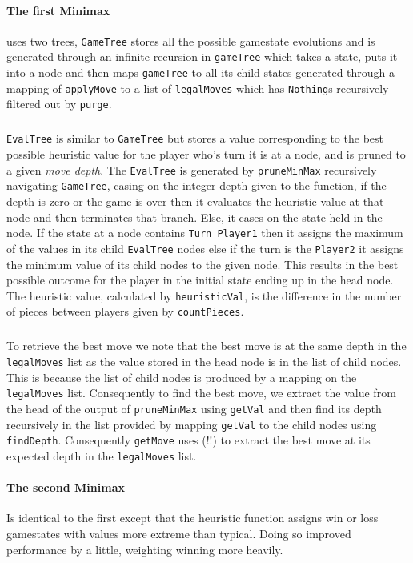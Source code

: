 \documentclass[11pt]{article}
\begin{document}
\paragraph{The first Minimax} uses two trees, \verb|GameTree| stores all the possible gamestate evolutions and is generated through an infinite recursion in \verb|gameTree| which takes a state, puts it into a node and then maps \verb|gameTree| to all its child states generated through a mapping of \verb|applyMove| to a list of \verb|legalMoves| which has \verb|Nothing|s recursively filtered out by \verb|purge|.

\subparagraph*{}\verb|EvalTree| is similar to \verb|GameTree| but stores a value corresponding to the best possible heuristic value for the player who's turn it is at a node, and is pruned to a given \textit{move depth}. The \verb|EvalTree| is generated by \verb|pruneMinMax| recursively navigating \verb|GameTree|, casing on the integer depth given to the function, if the depth is zero or the game is over then it evaluates the heuristic value at that node and then terminates that branch. Else, it cases on the state held in the node. If the state at a node contains \verb|Turn Player1| then it assigns the maximum of the values in its child \verb|EvalTree| nodes else if the turn is the \verb|Player2| it assigns the minimum value of its child nodes to the given node. This results in the best possible outcome for the player in the initial state ending up in the head node. The heuristic value, calculated by \verb|heuristicVal|, is the difference in the number of pieces between players given by \verb|countPieces|.

\subparagraph*{}To retrieve the best move we note that the best move is at the same depth in the \verb|legalMoves| list as the value stored in the head node is in the list of child nodes. This is because the list of child nodes is produced by a mapping on the \verb|legalMoves| list. Consequently to find the best move, we extract the value from the head of the output of \verb|pruneMinMax| using \verb|getVal| and then find its depth recursively in the list provided by mapping \verb|getVal| to the child nodes using \verb|findDepth|. Consequently \verb|getMove| uses (!!) to extract the best move at its expected depth in the \verb|legalMoves| list.

\paragraph*{The second Minimax} Is identical to the first except that the heuristic function assigns win or loss gamestates with values more extreme than typical. Doing so improved performance by a little, weighting winning more heavily.
\end{document}
